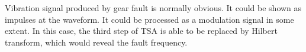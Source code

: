 Vibration signal produced by gear fault is normally obvious. It could be shown as impulses at the waveform. It could be processed as a modulation signal in some extent. In this case, the third step of TSA is able to be replaced by Hilbert transform, which would reveal the fault frequency.











